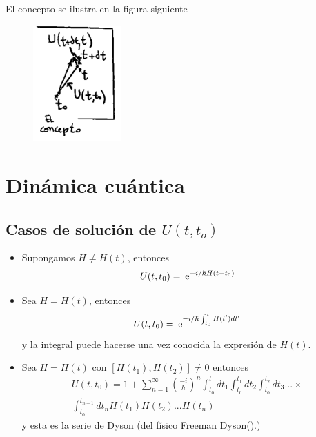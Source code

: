 \documentclass[10pt,oneside]{CBFT_book}
\begin{document}
El concepto se ilustra en la figura siguiente
\begin{figure}[htb]
	\begin{center}
	\includegraphics[width=0.3\textwidth]{images/teo2_5.pdf}	 
	\end{center}
	\caption{}
\end{figure} 



\section{Dinámica cuántica}

\subsection{Casos de solución de $U(t,t_o)$}

\begin{itemize}
 \item Supongamos $ H \neq H(t)$, entonces
 \[
	U( t, t_0) = \:\mathrm{e}^{-i/\hbar H (t-t_0)} 
 \]
 \item Sea $ H = H(t)$, entonces
 \[
	U( t, t_0) = \:\mathrm{e}^{-i/\hbar \int_{t_0}^t H(t')dt'} 
 \]
 y la integral puede hacerse una vez conocida la expresión de $H(t)$.
 \item Sea $ H = H(t)$ con $[H(t_1),H(t_2)] \neq 0$ entonces
 \begin{multline*}
	U( t, t_0) =  1 + \sum_{n=1}^{\infty} \left( \frac{-i}{\hbar}\right)^n 
		\int_{t_0}^t dt_1 \int_{t_0}^{t_1} dt_2 \int_{t_0}^{t_2} dt_3 ... \times \\
			\int_{t_0}^{t_{n-1}} dt_n H(t_1) H(t_2) ... H(t_n)    
 \end{multline*}
 y esta es la serie de Dyson (del físico Freeman Dyson().)
\end{itemize}
\end{document}
